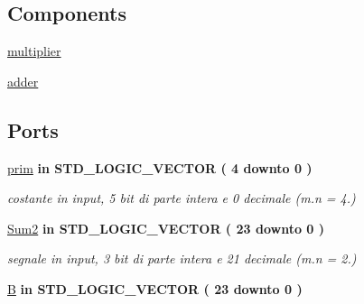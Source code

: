 \subsection*{Components}
 \begin{DoxyCompactItemize}
\item 
\hyperlink{group___linear_regression_ga3cf9cbfc3e637ae0660c32ceef50386f}{multiplier}  {\bfseries }  
\item 
\hyperlink{group___linear_regression_ga9d7a8a381439c61aea549e7a47ec7a6f}{adder}  {\bfseries }  
\end{DoxyCompactItemize}
\subsection*{Ports}
 \begin{DoxyCompactItemize}
\item 
\hyperlink{group___linear_regression_ga6b9afe9c48db695b7336519281c099a8}{prim}  {\bfseries {\bfseries \textcolor{vhdlchar}{in}\textcolor{vhdlchar}{ }}} {\bfseries \textcolor{vhdlchar}{S\+T\+D\+\_\+\+L\+O\+G\+I\+C\+\_\+\+V\+E\+C\+T\+OR}\textcolor{vhdlchar}{ }\textcolor{vhdlchar}{(}\textcolor{vhdlchar}{ }\textcolor{vhdlchar}{ } \textcolor{vhdldigit}{4} \textcolor{vhdlchar}{ }\textcolor{vhdlchar}{downto}\textcolor{vhdlchar}{ }\textcolor{vhdlchar}{ } \textcolor{vhdldigit}{0} \textcolor{vhdlchar}{ }\textcolor{vhdlchar}{)}\textcolor{vhdlchar}{ }} 
\begin{DoxyCompactList}\small\item\em costante in input, 5 bit di parte intera e 0 decimale (m.\+n = 4.) \end{DoxyCompactList}\item 
\hyperlink{group___linear_regression_ga4c98819455589b84c5e250a97e9bdfa1}{Sum2}  {\bfseries {\bfseries \textcolor{vhdlchar}{in}\textcolor{vhdlchar}{ }}} {\bfseries \textcolor{vhdlchar}{S\+T\+D\+\_\+\+L\+O\+G\+I\+C\+\_\+\+V\+E\+C\+T\+OR}\textcolor{vhdlchar}{ }\textcolor{vhdlchar}{(}\textcolor{vhdlchar}{ }\textcolor{vhdlchar}{ } \textcolor{vhdldigit}{23} \textcolor{vhdlchar}{ }\textcolor{vhdlchar}{downto}\textcolor{vhdlchar}{ }\textcolor{vhdlchar}{ } \textcolor{vhdldigit}{0} \textcolor{vhdlchar}{ }\textcolor{vhdlchar}{)}\textcolor{vhdlchar}{ }} 
\begin{DoxyCompactList}\small\item\em segnale in input, 3 bit di parte intera e 21 decimale (m.\+n = 2.) \end{DoxyCompactList}\item 
\hyperlink{group___linear_regression_gab6685be06ffd9f2425d01307287a4454}{B}  {\bfseries {\bfseries \textcolor{vhdlchar}{in}\textcolor{vhdlchar}{ }}} {\bfseries \textcolor{vhdlchar}{S\+T\+D\+\_\+\+L\+O\+G\+I\+C\+\_\+\+V\+E\+C\+T\+OR}\textcolor{vhdlchar}{ }\textcolor{vhdlchar}{(}\textcolor{vhdlchar}{ }\textcolor{vhdlchar}{ } \textcolor{vhdldigit}{23} \textcolor{vhdlchar}{ }\textcolor{vhdlchar}{downto}\textcolor{vhdlchar}{ }\textcolor{vhdlchar}{ } \textcolor{vhdldigit}{0} \textcolor{vhdlchar}{ }\textcolor{vhdlchar}{)}\textcolor{vhdlchar}{ }} 

\end{DoxyCompactItemize}
